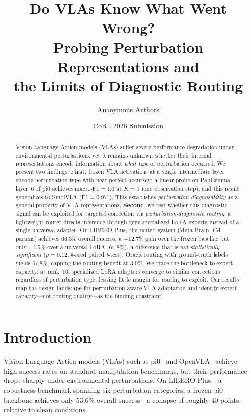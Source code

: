 \documentclass[letterpaper]{article}
\title{Do VLAs Know What Went Wrong?\\Probing Perturbation Representations and\\the Limits of Diagnostic Routing}
\author[1]{Anonymous Authors}
\affil[1]{Anonymous Institution}
\date{CoRL 2026 Submission}
\newcommand{\ours}{Meta-Brain}
\newcommand{\libeplus}{LIBERO-Plus}
\begin{document}
\maketitle

\begin{abstract}
Vision-Language-Action models (VLAs) suffer severe performance degradation under environmental perturbations, yet it remains unknown whether their internal representations encode information about \emph{what type} of perturbation occurred.
We present two findings.
\textbf{First}, frozen VLA activations at a single intermediate layer encode perturbation type with near-perfect accuracy: a linear probe on PaliGemma layer~6 of pi0 achieves macro-F1$=$1.0 at $K{=}1$ (one observation step), and this result generalizes to SmolVLA (F1$=$0.971).
This establishes \emph{perturbation diagnosability} as a general property of VLA representations.
\textbf{Second}, we test whether this diagnostic signal can be exploited for targeted correction via \emph{perturbation-diagnostic routing}: a lightweight router directs inference through type-specialized LoRA experts instead of a single universal adapter.
On \libeplus{}, the routed system (\ours{}, 6M params) achieves 66.3\% overall success, a +12.7\% gain over the frozen baseline but only +1.5\% over a universal LoRA (64.8\%), a difference that is \emph{not statistically significant} ($p{=}0.12$, 5-seed paired $t$-test).
Oracle routing with ground-truth labels yields 67.8\%, capping the routing benefit at 3.0\%.
We trace the bottleneck to expert capacity: at rank~16, specialized LoRA adapters converge to similar corrections regardless of perturbation type, leaving little margin for routing to exploit.
Our results map the design landscape for perturbation-aware VLA adaptation and identify expert capacity---not routing quality---as the binding constraint.
\end{abstract}

\section{Introduction}
\label{sec:intro}

Vision-Language-Action models (VLAs) such as pi0~\cite{black2024pi0} and OpenVLA~\cite{kim2024openvla} achieve high success rates on standard manipulation benchmarks, but their performance drops sharply under environmental perturbations.
On \libeplus{}~\cite{zhou2025liberoplus}, a robustness benchmark spanning six perturbation categories, a frozen pi0 backbone achieves only 53.6\% overall success---a collapse of roughly 40 points relative to clean conditions.
\end{document}
